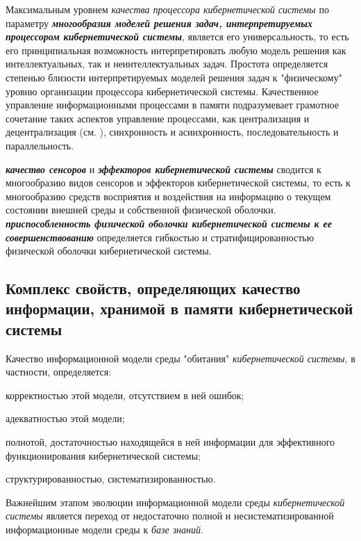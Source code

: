 Максимальным уровнем \textit{качества процессора кибернетической системы} по параметру \textbf{\textit{многообразия \textit{моделей решения задач}, интерпретируемых \textit{процессором кибернетической системы}}}, является его универсальность, то есть его принципиальная возможность интерпретировать любую модель решения как интеллектуальных, так и неинтеллектуальных задач. 
Простота определяется степенью близости интерпретируемых моделей решения задач к "физическому"{} уровню организации процессора кибернетической системы. 
Качественное управление информационными процессами в памяти подразумевает грамотное сочетание таких аспектов управление процессами, как централизация и децентрализация (см. ), синхронность и асинхронность, последовательность и параллельность.

\textbf{\textit{качество сенсоров}} и \textbf{\textit{эффекторов кибернетической системы}} сводится к многообразию видов сенсоров и эффекторов кибернетической системы, то есть к многообразию средств восприятия и воздействия на информацию о текущем состоянии внешней среды и собственной физической оболочки.
\textbf{\textit{приспособленность физической оболочки кибернетической системы к ее совершенствованию}} определяется гибкостью и стратифицированностью физической оболочки кибернетической системы.

\subsection{Комплекс свойств, определяющих качество информации, хранимой в памяти кибернетической системы}
{\label{sec_cyb_syst_information_quality}} 

Качество информационной модели среды "обитания"{} \textit{кибернетической системы}, в частности, определяется:
\begin{textitemize}
    \item корректностью этой модели, отсутствием в ней ошибок;
    \item адекватностью этой модели;
    \item полнотой, достаточностью находящейся в ней информации для эффективного функционирования кибернетической системы;
    \item структурированностью, систематизированностью.
\end{textitemize}

Важнейшим этапом эволюции информационной модели среды \textit{кибернетической системы} является переход от недостаточно полной и несистематизированной информационные модели среды к \textit{базе знаний}.

